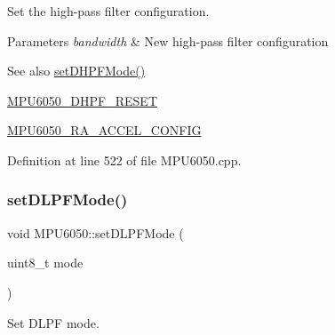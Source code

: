 Set the high-\/pass filter configuration. 
\begin{DoxyParams}{Parameters}
{\em bandwidth} & New high-\/pass filter configuration \\
\hline
\end{DoxyParams}
\begin{DoxySeeAlso}{See also}
\mbox{\hyperlink{classMPU6050_a44cc43aaad1e52c1ba3142d4490af611}{set\+D\+H\+P\+F\+Mode()}} 

\mbox{\hyperlink{MPU6050_8h_aa27e7511d60ab2f0d99b4bb138539e25}{M\+P\+U6050\+\_\+\+D\+H\+P\+F\+\_\+\+R\+E\+S\+ET}} 

\mbox{\hyperlink{MPU6050_8h_a48b7d7b24a70b247e373bc5965a5dcc7}{M\+P\+U6050\+\_\+\+R\+A\+\_\+\+A\+C\+C\+E\+L\+\_\+\+C\+O\+N\+F\+IG}} 
\end{DoxySeeAlso}


Definition at line 522 of file M\+P\+U6050.\+cpp.


\begin{DoxyCode}{0}

\end{DoxyCode}
\mbox{\label{classMPU6050_a7a782ade8af2f88dfef7171487f59a3b}} 
\subsubsection{\texorpdfstring{setDLPFMode()}{setDLPFMode()}}
{\footnotesize\ttfamily void M\+P\+U6050\+::set\+D\+L\+P\+F\+Mode (\begin{DoxyParamCaption}\item[{uint8\+\_\+t}]{mode }\end{DoxyParamCaption})}

Set D\+L\+PF mode.


